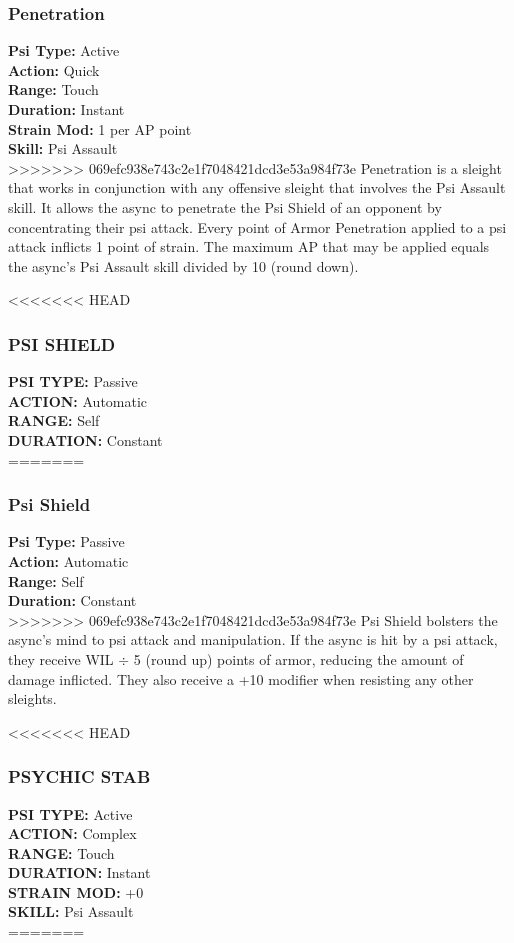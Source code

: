 \subsubsection{Penetration}
\textbf{Psi Type:} Active \\ 
\textbf{Action:} Quick \\ 
\textbf{Range:} Touch \\ 
\textbf{Duration:} Instant \\
\textbf{Strain Mod:} 1 per AP point \\ 
\textbf{Skill:} Psi Assault \\
>>>>>>> 069efc938e743c2e1f7048421dcd3e53a984f73e
Penetration is a sleight that works in conjunction with
any offensive sleight that involves the Psi Assault skill.
It allows the async to penetrate the Psi Shield of an opponent
by concentrating their psi attack. Every point
of Armor Penetration applied to a psi attack inflicts
1 point of strain. The maximum AP that may be applied
equals the async’s Psi Assault skill divided by 10
(round down).

<<<<<<< HEAD
\subsubsection{PSI SHIELD}
\textbf{PSI TYPE:} Passive \\ 
\textbf{ACTION:} Automatic \\ 
\textbf{RANGE:} Self \\ 
\textbf{DURATION:} Constant \\
=======
\subsubsection{Psi Shield}
\textbf{Psi Type:} Passive \\ 
\textbf{Action:} Automatic \\ 
\textbf{Range:} Self \\ 
\textbf{Duration:} Constant \\
>>>>>>> 069efc938e743c2e1f7048421dcd3e53a984f73e
Psi Shield bolsters the async’s mind to psi attack and
manipulation. If the async is hit by a psi attack, they
receive WIL $\div$ 5 (round up) points of armor, reducing
the amount of damage inflicted. They also receive a
+10 modifier when resisting any other sleights.

<<<<<<< HEAD
\subsubsection{PSYCHIC STAB}
\textbf{PSI TYPE:} Active \\ 
\textbf{ACTION:} Complex \\ 
\textbf{RANGE:} Touch \\ 
\textbf{DURATION:} Instant \\
\textbf{STRAIN MOD:} +0 \\ 
\textbf{SKILL:} Psi Assault \\
=======

